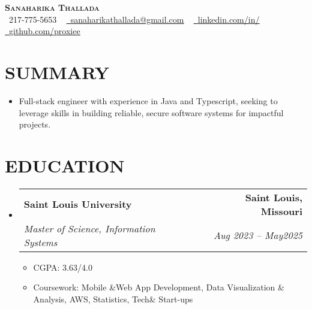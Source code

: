 \documentclass[letterpaper,11pt]{article}
\makeatletter
\newcommand{\resumeItem}[1]{\item\small{{#1 \vspace{-3pt}}}}
\newcommand{\resumeSubheading}[4]{\vspace{-2pt}\item\begin{tabular*}{0.97\textwidth}[t]{l@{\extracolsep{\fill}}r}\textbf{#1} & #2 \\ \textit{\small#3} & \textit{\small #4} \\ \end{tabular*}\vspace{-7pt}}
\newcommand{\resumeSubHeadingListStart}{\begin{itemize}[leftmargin=0.15in, label={}]}
\newcommand{\resumeSubHeadingListEnd}{\end{itemize}}
\newcommand{\resumeItemListStart}{\begin{itemize}}
\newcommand{\resumeItemListEnd}{\end{itemize}\vspace{-5pt}}
\makeatother
\begin{document}
\begin{center}
    \textbf{\Huge \scshape {\fontsize{15pt}{20pt}\selectfont Sanaharika Thallada}} \\ \vspace{1pt}
    \small \raisebox{-0.1\height}\faPhone\ 217-775-5653 ~ \href{mailto:sanaharikathallada@gmail.com}{\raisebox{-0.2\height}\faEnvelope\  \underline{sanaharikathallada@gmail.com}} ~ 
    \href{https://www.linkedin.com/in/yashwanthtirupati/}{\raisebox{-0.2\height}\faLinkedin\ \underline{linkedin.com/in/}} ~ 
    \href{https://github.com/proxiee}{\raisebox{-0.2\height}\faGithub\ \underline{github.com/proxiee}}
    \vspace{-8pt}
\end{center}

\section{{\fontsize{9pt}{20pt}\selectfont \textbf{SUMMARY}}}\resumeSubHeadingListStart
\resumeItem{Full-stack engineer with experience in Java and Typescript, seeking to leverage skills in building reliable, secure software systems for impactful projects.}
\resumeSubHeadingListEnd\vspace{-18pt}
\section{{\fontsize{9pt}{20pt}\selectfont \textbf{EDUCATION}}}\resumeSubHeadingListStart
\resumeSubheading{Saint Louis University}{\textbf{Saint Louis, Missouri}}{Master of Science, Information Systems}{Aug 2023 – May2025}
\resumeItemListStart
\resumeItem{CGPA: 3.63/4.0}
\resumeItem{Coursework: Mobile \&Web App Development, Data Visualization \& Analysis, AWS, Statistics, Tech\& Start-ups}
\resumeItemListEnd
\resumeSubHeadingListEnd\vspace{-18pt}
\end{document}
